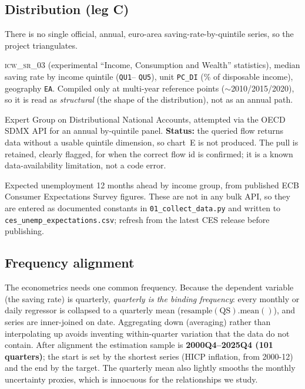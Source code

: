 \documentclass[11pt,a4paper]{article}
\newcommand{\code}[1]{\texttt{#1}}
\newcommand{\dataset}[1]{\textsc{#1}}
\begin{document}
\subsection{Distribution (leg C)}
There is no single official, annual, euro-area saving-rate-by-quintile series, so
the project triangulates.
\begin{description}[leftmargin=1.4em,style=nextline]
\item[Eurostat ICW] \dataset{icw\_sr\_03} (experimental ``Income, Consumption and
  Wealth'' statistics), median saving rate by income quintile (\code{QU1}--%
  \code{QU5}), unit \code{PC\_DI} (\% of disposable income), geography \code{EA}.
  Compiled only at multi-year reference points ($\sim$2010/2015/2020), so it is
  read as \emph{structural} (the shape of the distribution), not as an annual
  path.
\item[OECD EG DNA] Expert Group on Distributional National Accounts, attempted
  via the OECD SDMX API for an annual by-quintile panel. \textbf{Status:} the
  queried flow returns data without a usable quintile dimension, so chart~E is
  not produced. The pull is retained, clearly flagged, for when the correct flow
  id is confirmed; it is a known data-availability limitation, not a code error.
\item[ECB CES expectations] Expected unemployment 12 months ahead by income
  group, from published ECB Consumer Expectations Survey figures. These are not
  in any bulk API, so they are entered as documented constants in
  \code{01\_collect\_data.py} and written to
  \code{ces\_unemp\_expectations.csv}; refresh from the latest CES release before
  publishing.
\end{description}

\subsection{Frequency alignment}\label{sec:freq}
The econometrics needs one common frequency. Because the dependent variable (the
saving rate) is quarterly, \emph{quarterly is the binding frequency}: every
monthly or daily regressor is collapsed to a quarterly mean
($\text{resample}(\text{QS}).\text{mean}()$), and series are inner-joined on
date. Aggregating down (averaging) rather than interpolating up avoids inventing
within-quarter variation that the data do not contain. After alignment the
estimation sample is \textbf{2000Q4--2025Q4 (101 quarters)}; the start is set by
the shortest series (HICP inflation, from 2000-12) and the end by the
target. The quarterly mean also lightly smooths the monthly uncertainty proxies,
which is innocuous for the relationships we study.
\end{document}
